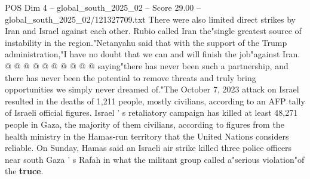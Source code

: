 \begin{textsample}{POS Dim 4 – global\_south\_2025\_02 – Score 29.00 – global\_south\_2025\_02/121327709.txt}
There were also limited direct strikes by Iran and Israel against each other.
Rubio called Iran the"single greatest source of instability in the region."Netanyahu said that with the support of the Trump administration,"I have no doubt that we can and will finish the job"against Iran. @ @ @ @ @ @ @ @ @ @ saying"there has never been such a partnership, and there has never been the potential to remove threats and truly bring opportunities we simply never dreamed of."The October 7, 2023 attack on Israel resulted in the deaths of 1,211 people, mostly civilians, according to an AFP tally of Israeli official figures.
Israel ' s retaliatory campaign has killed at least 48,271 people in Gaza, the majority of them civilians, according to figures from the health ministry in the Hamas-run territory that the United Nations considers reliable.
On Sunday, Hamas said an Israeli air strike killed three police officers near south Gaza ' s Rafah in what the militant group called a"serious violation"of the \textbf{truce}.

\end{textsample}
